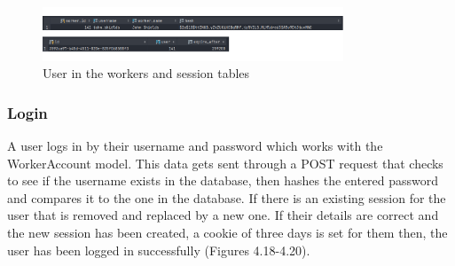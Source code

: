 \begin{figure}[H]
    \caption{User in the workers and session tables}
    \label{image:userinDb}
    \centering
    \includegraphics[width=0.8\textwidth]{images/database/usr_In_db.png}
\end{figure}

\subsubsection{Login}
A user logs in by their username and password which works with the WorkerAccount model. This data gets sent through a POST request that checks to see if the username exists in the database, then hashes the entered password and compares it to the one in the database. If there is an existing session for the user that is removed and replaced by a new one. If their details are correct and the new session has been created, a cookie of three days is set for them then, the user has been logged in successfully (Figures 4.18-4.20).

